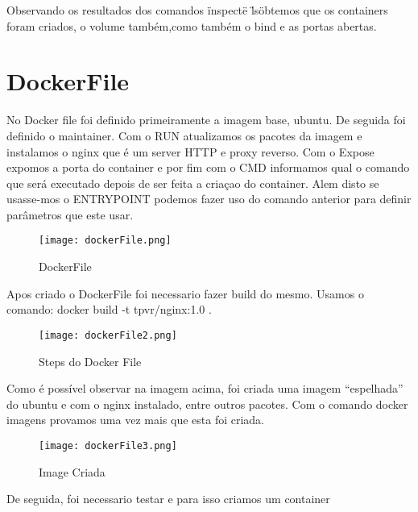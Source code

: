 Observando os resultados dos comandos \"inspect\" e \"ls\" obtemos que os containers foram criados, o volume também,como também o bind e as portas abertas.

\section{DockerFile}

No Docker file foi definido primeiramente a imagem base, ubuntu. De seguida foi definido o maintainer. Com o RUN atualizamos os pacotes da imagem e instalamos o nginx que é um server HTTP e proxy reverso. Com o Expose expomos a porta do container e por fim com o CMD informamos qual o comando que será executado depois de ser feita a criaçao do container. Alem disto se usasse-mos o ENTRYPOINT podemos fazer uso do comando anterior para definir parâmetros que este usar.

\begin{figure}[H]

	\centering
	\texttt{[image: dockerFile.png]}

 	\caption {DockerFile}

  	\label {fig:DocCom1}
\end{figure}

Apos criado o DockerFile foi necessario fazer build do mesmo. Usamos o comando:
docker build -t tpvr/nginx:1.0 .

\begin{figure}[H]

	\centering
	\texttt{[image: dockerFile2.png]}

 	\caption {Steps do Docker File}

  	\label {fig:DocCom2}
\end{figure}


Como é possível observar na imagem acima, foi criada uma imagem “espelhada” do ubuntu e com o nginx instalado, entre outros pacotes. Com o comando docker imagens provamos uma vez mais que esta foi criada.

\begin{figure}[H]

	\centering
	\texttt{[image: dockerFile3.png]}

 	\caption {Image Criada}

  	\label {fig:DocCom3}
\end{figure}


De seguida, foi necessario testar e para isso criamos um container 

